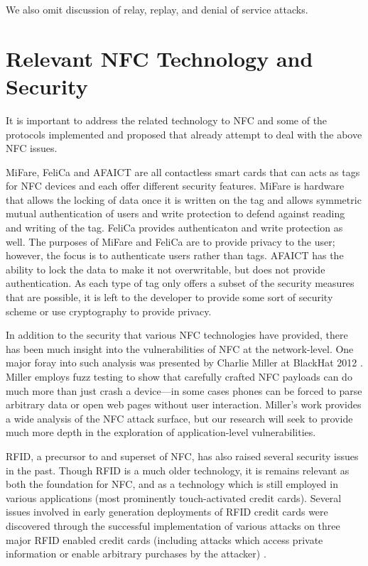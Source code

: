 \documentclass[12pt]{article}
\begin{document}
We also omit discussion of relay, replay, and denial of service attacks.

\section{Relevant NFC Technology and Security}
It is important to address the related technology to NFC and some of the protocols implemented and proposed that already attempt to deal with the above NFC issues. 

MiFare, FeliCa and AFAICT are all contactless smart cards that can acts as tags for NFC devices and each offer different security features. MiFare is hardware that allows the locking of data once it is written on the tag and allows symmetric mutual authentication of users and write protection to defend against reading and writing of the tag. FeliCa provides authenticaton and write protection as well. The purposes of MiFare and FeliCa are to provide privacy to the user; however, the focus is to authenticate users rather than tags. AFAICT has the ability to lock the data to make it not overwritable, but does not provide authentication. As each type of tag only offers a subset of the security measures that are possible, it is left to the developer to provide some sort of security scheme or use cryptography to provide privacy. 

In addition to the security that various NFC technologies have provided, there has been much insight into the vulnerabilities of NFC at the network-level. 
One major foray into such analysis was presented by Charlie Miller at BlackHat 2012 \cite{miller2012}.
Miller employs fuzz testing to show that carefully crafted NFC payloads can do much more than just crash a device---in some cases phones can be forced to parse arbitrary data or open web pages without user interaction.
Miller's work provides a wide analysis of the NFC attack surface, but our research will seek to provide much more depth in the exploration of application-level vulnerabilities.

RFID, a precursor to and superset of NFC, has also raised several security issues in the past.
Though RFID is a much older technology, it is remains relevant as both the foundation for NFC, and as a technology which is still employed in various applications (most prominently touch-activated credit cards).
Several issues involved in early generation deployments of RFID credit cards were discovered through the successful implementation of various attacks on three major RFID enabled credit cards (including attacks which access private information or enable arbitrary purchases by the attacker) \cite{heydtbenjamin2007}.
\end{document}
